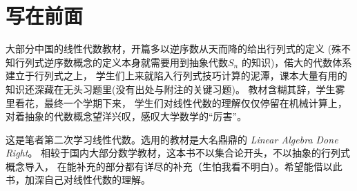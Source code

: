 \chapter*{写在前面}
大部分中国的线性代数教材，开篇多以逆序数从天而降的给出行列式的定义
(殊不知行列式逆序数概念的定义本身就需要用到抽象代数\(S_{n}\) 的知识)，偌大的代数体系建立于行列式之上，
学生们上来就陷入行列式技巧计算的泥潭，课本大量有用的知识还深藏在无头习题里(没有出处与附注的关键习题)。
教材含糊其辞，学生雾里看花，最终一个学期下来，
学生们对线性代数的理解仅仅停留在机械计算上，对着抽象的代数概念望洋兴叹，感叹大学数学的``厉害''。

这是笔者第二次学习线性代数。选用的教材是大名鼎鼎的 \emph{Linear Algebra Done Right}。
相较于国内大部分数学教材，这本书不以集合论开头，不以抽象的行列式概念导入，
在能补充的部分都有详尽的补充（生怕我看不明白）。希望能借以此书，加深自己对线性代数的理解。
